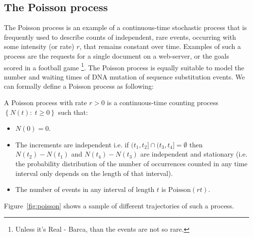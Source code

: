 \subsection{The Poisson process\label{sub:poisson}}

The Poisson process is an example of a continuous-time stochastic process that is frequently used to describe counts of independent, rare events, occurring with some intensity (or rate) $r$, that remains constant over time. 
Examples of such a process are the requests for a single document on a web-server, or the goals scored in a football game \footnote{Unless it's Real - Barca, than the events are not so rare.}.%
The Poisson process is equally suitable to model the number and waiting times of DNA mutation of sequence substitution events. 
We can formally define a Poisson process as following:

\begin{definition} 
A Poisson process with rate $r>0$ is a continuous-time counting process $\left\{ N(t):\; t\geq0\right\}$ such that:

\begin{itemize}
\item $N(0)=0$.
\item The increments are independent i.e. if $(t_{1},t_{2}]\cap(t_{3},t_{4}]=\emptyset$ then $N(t_2)-N(t_1)$ and $N(t_4)-N(t_3)$ are independent and stationary (i.e. the probability distribution of the number of occurrences counted in any time interval only depends on the length of that interval).
\item The number of events in any interval of length $t$ is $\text{Poisson}(r t)$.
\end{itemize}

Figure~\ref{fig:poisson} shows a sample of different trajectories of such a process.

\label{def:poisson}
\end{definition}



